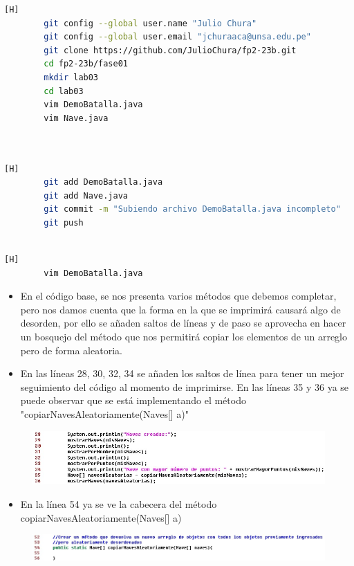 \documentclass{article}
\begin{document}
	\begin{lstlisting}[language=bash,caption={Inicializando los archivos DemoBatalla.java y Nave.java}][H]
		git config --global user.name "Julio Chura"
		git config --global user.email "jchuraaca@unsa.edu.pe"
		git clone https://github.com/JulioChura/fp2-23b.git
		cd fp2-23b/fase01
		mkdir lab03
		cd lab03
		vim DemoBatalla.java
		vim Nave.java
		
		
	\end{lstlisting}
	
	\begin{lstlisting}[language=bash,caption={Commit: Subiendo archivo DemoBatalla.java incompleto }][H]
		git add DemoBatalla.java
		git add Nave.java
		git commit -m "Subiendo archivo DemoBatalla.java incompleto"
		git push
		
	\end{lstlisting}
	
		
	
	
	\begin{lstlisting}[language=bash,caption={Dándole forma y aumentando algunas líneas}][H]
		vim DemoBatalla.java	
	\end{lstlisting}
	\begin{itemize}	
		\item En el código base, se nos presenta varios métodos que debemos completar, pero nos damos cuenta que la forma en la que se imprimirá causará algo de desorden, por ello se añaden saltos de líneas y de paso se aprovecha en hacer un bosquejo del método que nos permitirá copiar los elementos de un arreglo pero de forma aleatoria.
	   \item En las líneas 28, 30, 32, 34 se añaden los saltos de línea para tener un mejor seguimiento del código al momento de imprimirse. En las líneas 35 y 36 ya se puede observar que se está implementando el método "copiarNavesAleatoriamente(Naves[] a)"
	\end{itemize}
	
	\begin{figure}[H]
		\centering
		\includegraphics[width=1\textwidth,keepaspectratio]{img/1.jpg}
	\end{figure}
	\begin{itemize}	
		\item En la línea 54 ya se ve la cabecera del método copiarNavesAleatoriamente(Naves[] a)
	\end{itemize}
		\begin{figure}[H]
		\centering
		\includegraphics[width=1\textwidth,keepaspectratio]{img/2.jpg}
	\end{figure}
	
\end{document}
